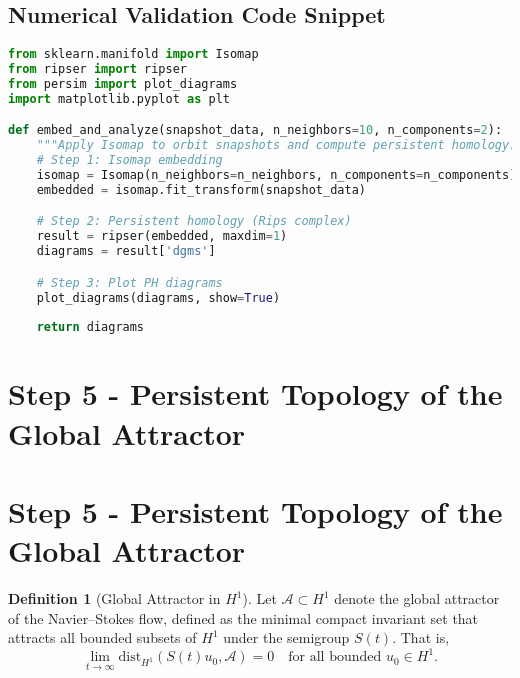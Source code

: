 \documentclass[11pt]{article}
\theoremstyle{definition}
\newtheorem{definition}[theorem]{Definition}
\begin{document}
\subsection*{Numerical Validation Code Snippet}
\begin{lstlisting}[language=Python, caption=Isomap + Persistent Homology Validation for Navier--Stokes Orbit Geometry]
from sklearn.manifold import Isomap
from ripser import ripser
from persim import plot_diagrams
import matplotlib.pyplot as plt

def embed_and_analyze(snapshot_data, n_neighbors=10, n_components=2):
    """Apply Isomap to orbit snapshots and compute persistent homology."""
    # Step 1: Isomap embedding
    isomap = Isomap(n_neighbors=n_neighbors, n_components=n_components)
    embedded = isomap.fit_transform(snapshot_data)

    # Step 2: Persistent homology (Rips complex)
    result = ripser(embedded, maxdim=1)
    diagrams = result['dgms']

    # Step 3: Plot PH diagrams
    plot_diagrams(diagrams, show=True)
    
    return diagrams
\end{lstlisting}

\section{Step 5 - Persistent Topology of the Global Attractor}
\label{sec:step5}


\section{Step 5 - Persistent Topology of the Global Attractor}
\label{sec:step5}


\begin{definition}[Global Attractor in $H^1$]
Let $\mathcal{A} \subset H^1$ denote the global attractor of the Navier--Stokes flow, defined as the minimal compact invariant set that attracts all bounded subsets of $H^1$ under the semigroup $S(t)$. That is,
\[
\lim_{t \to \infty} \mathrm{dist}_{H^1}(S(t)u_0, \mathcal{A}) = 0 \quad \text{for all bounded } u_0 \in H^1.
\]
\end{definition}
\end{document}
